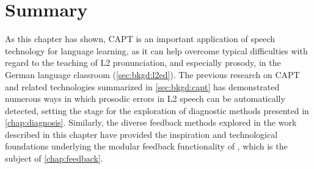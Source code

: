 %
%			
%		
%
%		
%		
%		

\section{Summary}
\label{sec:bkgd:summary}


As this chapter has shown, CAPT is an important application of speech technology for language learning, as it can help overcome typical difficulties with regard to the teaching of L2 pronunciation, and especially prosody, in the German language classroom (\cref{sec:bkgd:l2ed}). The previous research on CAPT and related technologies summarized in \cref{sec:bkgd:capt} has demonstrated numerous ways in which prosodic errors in L2 speech can be automatically detected, 
setting the stage for the exploration of diagnostic methods presented in \cref{chap:diagnosis}.
%
Similarly, the diverse feedback methods explored in the work described in this chapter have provided the inspiration and technological foundations underlying the modular feedback functionality of , which is the subject of \cref{chap:feedback}.

